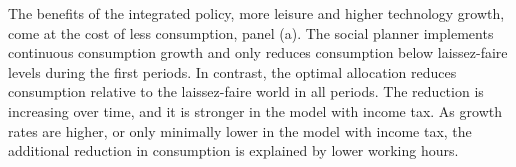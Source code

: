 

The benefits of the integrated policy, more leisure and higher technology growth, come at the cost of less consumption, panel (a). 
 The social planner implements continuous consumption growth and only reduces consumption below laissez-faire levels during the first periods. In contrast, the optimal allocation reduces consumption relative to the laissez-faire world in all periods. The reduction is increasing over time, %
  and it is stronger in the model with income tax. As growth rates are higher, or only minimally lower in the model with income tax, the additional reduction in consumption is explained by lower working hours. %


